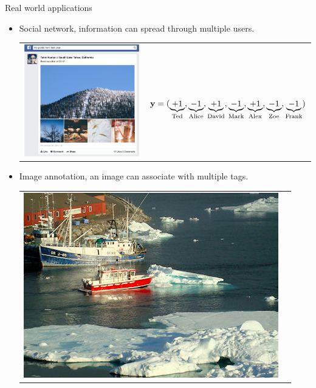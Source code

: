 \documentclass[first=dgreen,second=purple,logo=yellowexc]{aaltoslides}
\begin{document}
%
\begin{frame}{Real world applications}
	\begin{itemize}\footnotesize
		\item Social network, information can spread through multiple users. 
		\begin{tabular}{p{3cm}p{10cm}} 
	    \multirow{2}{*}{\includegraphics[scale = 0.06]{./figures/facebookvideo.png}} & \\
		& $\mathbf {y}=(\underbrace{+1}_{\text{Ted}},\underbrace{-1}_{\text{Alice}},\underbrace{+1}_{\text{David}},\underbrace{-1}_{\text{Mark}},\underbrace{+1}_{\text{Alex}},\underbrace{-1}_{\text{Zoe}},\underbrace{-1}_{\text{Frank}})$\\
	    \end{tabular}
		\item Image annotation, an image can associate with multiple tags.
		\begin{tabular}{p{3cm}p{10cm}}
        \multirow{2}{*}{\includegraphics[scale = 0.11]{./figures/boatsea.png}} & \\

\end{tabular}
\end{itemize}
\end{frame}
\end{document}
